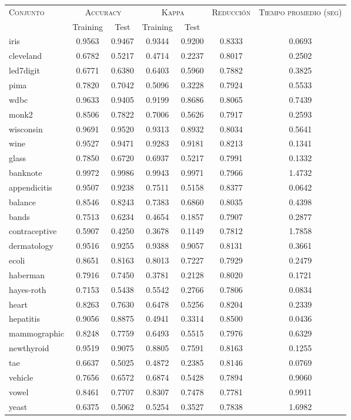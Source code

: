 \begin{table}[]
\centering
\begin{tabular}{l c c c c c c}
\hline
\multirow{2}{*}{\textsc{Conjunto}}
	& \multicolumn{2}{c}{\textsc{Accuracy}}
	& \multicolumn{2}{c}{\textsc{Kappa}}
	& \textsc{Reducción}
	& \textsc{Tiempo promedio (seg)} \\
	& Training & Test
	& Training & Test \\ 
\hline
\hline

iris & 0.9563 & 0.9467 & 0.9344 & 0.9200 & 0.8333 & 0.0693 \\
cleveland & 0.6782 & 0.5217 & 0.4714 & 0.2237 & 0.8017 & 0.2502 \\
led7digit & 0.6771 & 0.6380 & 0.6403 & 0.5960 & 0.7882 & 0.3825 \\
pima & 0.7820 & 0.7042 & 0.5096 & 0.3228 & 0.7924 & 0.5533 \\
wdbc & 0.9633 & 0.9405 & 0.9199 & 0.8686 & 0.8065 & 0.7439 \\
monk2 & 0.8506 & 0.7822 & 0.7006 & 0.5626 & 0.7917 & 0.2593 \\
wisconsin & 0.9691 & 0.9520 & 0.9313 & 0.8932 & 0.8034 & 0.5641 \\
wine & 0.9527 & 0.9471 & 0.9283 & 0.9181 & 0.8213 & 0.1341 \\
glass & 0.7850 & 0.6720 & 0.6937 & 0.5217 & 0.7991 & 0.1332 \\
banknote & 0.9972 & 0.9986 & 0.9943 & 0.9971 & 0.7966 & 1.4732 \\
appendicitis & 0.9507 & 0.9238 & 0.7511 & 0.5158 & 0.8377 & 0.0642 \\
balance & 0.8546 & 0.8243 & 0.7383 & 0.6860 & 0.8035 & 0.4398 \\
bands & 0.7513 & 0.6234 & 0.4654 & 0.1857 & 0.7907 & 0.2877 \\
contraceptive & 0.5907 & 0.4250 & 0.3678 & 0.1149 & 0.7812 & 1.7858 \\
dermatology & 0.9516 & 0.9255 & 0.9388 & 0.9057 & 0.8131 & 0.3661 \\
ecoli & 0.8651 & 0.8163 & 0.8013 & 0.7227 & 0.7929 & 0.2479 \\
haberman & 0.7916 & 0.7450 & 0.3781 & 0.2128 & 0.8020 & 0.1721 \\
hayes-roth & 0.7153 & 0.5438 & 0.5542 & 0.2766 & 0.7806 & 0.0834 \\
heart & 0.8263 & 0.7630 & 0.6478 & 0.5256 & 0.8204 & 0.2339 \\
hepatitis & 0.9056 & 0.8875 & 0.4941 & 0.3314 & 0.8500 & 0.0436 \\
mammographic & 0.8248 & 0.7759 & 0.6493 & 0.5515 & 0.7976 & 0.6329 \\
newthyroid & 0.9519 & 0.9075 & 0.8805 & 0.7591 & 0.8163 & 0.1255 \\
tae & 0.6637 & 0.5025 & 0.4872 & 0.2385 & 0.8146 & 0.0769 \\
vehicle & 0.7656 & 0.6572 & 0.6874 & 0.5428 & 0.7894 & 0.9060 \\
vowel & 0.8461 & 0.7707 & 0.8307 & 0.7478 & 0.7781 & 0.9911 \\
yeast & 0.6375 & 0.5062 & 0.5254 & 0.3527 & 0.7838 & 1.6982 \\


\end{tabular}
\end{table}
